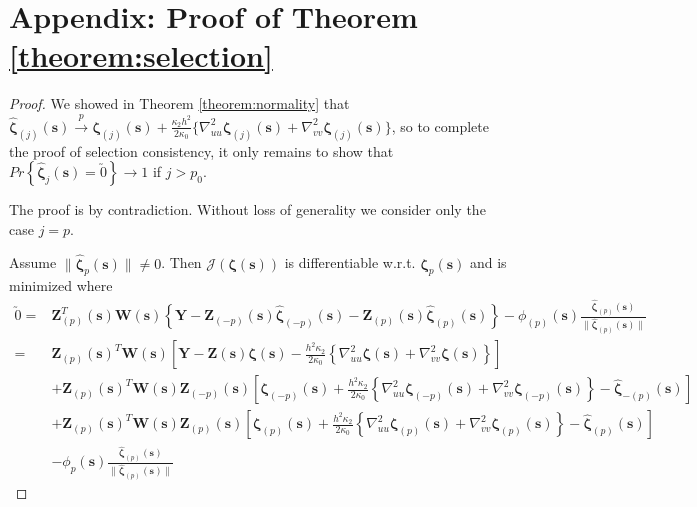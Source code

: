 \documentclass[authoryear,review, 12pt]{elsarticle}
\begin{document}
\section*{Appendix: Proof of Theorem \ref{theorem:selection}\label{sec:gaussian-selection-proof}}
\begin{proof}
We showed in Theorem \ref{theorem:normality} that $\hat{\bm{\zeta}}_{\left(j\right)}\left(\bm{s}\right)\xrightarrow{p}\bm{\zeta}_{\left(j\right)}\left(\bm{s}\right)+\frac{\kappa_{2}h^{2}}{2\kappa_{0}}\{\nabla_{uu}^{2}\bm{\zeta}_{\left(j\right)}\left(\bm{s}\right)+\nabla_{vv}^{2}\bm{\zeta}_{\left(j\right)}\left(\bm{s}\right)\}$,
so to complete the proof of selection consistency, it only remains
to show that $Pr\left\{ \hat{\bm{\zeta}}_{j}\left(\bm{s}\right)=\utilde{0}\right\} \to1$
if $j>p_{0}$.

The proof is by contradiction. Without loss of generality we consider
only the case $j=p$.

Assume $\|\hat{\bm{\zeta}}_{p}(\bm{s})\|\ne0$. Then $\mathcal{J}\left(\bm{\zeta}\left(\bm{s}\right)\right)$
is differentiable w.r.t. $\bm{\zeta}_{p}\left(\bm{s}\right)$ and
is minimized where 
\begin{align*}
\utilde{0}= & \bm{Z}_{\left(p\right)}^{T}\left(\bm{s}\right)\bm{W}\left(\bm{s}\right)\left\{ \bm{Y}-\bm{Z}_{\left(-p\right)}\left(\bm{s}\right)\hat{\bm{\zeta}}_{\left(-p\right)}\left(\bm{s}\right)-\bm{Z}_{\left(p\right)}\left(\bm{s}\right)\hat{\bm{\zeta}}_{\left(p\right)}\left(\bm{s}\right)\right\} -\phi_{\left(p\right)}(\bm{s})\frac{\hat{\bm{\zeta}}_{\left(p\right)}\left(\bm{s}\right)}{\|\hat{\bm{\zeta}}_{\left(p\right)}\left(\bm{s}\right)\|}\\
= & \bm{Z}_{\left(p\right)}\left(\bm{s}\right)^{T}\bm{W}\left(\bm{s}\right)\left[\bm{Y}-\bm{Z}\left(\bm{s}\right)\bm{\zeta}\left(\bm{s}\right)-\frac{h^{2}\kappa_{2}}{2\kappa_{0}}\left\{ \nabla_{uu}^{2}\bm{\zeta}\left(\bm{s}\right)+\nabla_{vv}^{2}\bm{\zeta}\left(\bm{s}\right)\right\} \right]\\
 & +\bm{Z}_{\left(p\right)}\left(\bm{s}\right)^{T}\bm{W}\left(\bm{s}\right)\bm{Z}_{\left(-p\right)}\left(\bm{s}\right)\left[\bm{\zeta}_{\left(-p\right)}\left(\bm{s}\right)+\frac{h^{2}\kappa_{2}}{2\kappa_{0}}\left\{ \nabla_{uu}^{2}\bm{\zeta}_{\left(-p\right)}\left(\bm{s}\right)+\nabla_{vv}^{2}\bm{\zeta}_{\left(-p\right)}\left(\bm{s}\right)\right\} -\hat{\bm{\zeta}}_{-\left(p\right)}\left(\bm{s}\right)\right]\\
 & +\bm{Z}_{\left(p\right)}\left(\bm{s}\right)^{T}\bm{W}\left(\bm{s}\right)\bm{Z}_{\left(p\right)}\left(\bm{s}\right)\left[\bm{\zeta}_{\left(p\right)}\left(\bm{s}\right)+\frac{h^{2}\kappa_{2}}{2\kappa_{0}}\left\{ \nabla_{uu}^{2}\bm{\zeta}_{\left(p\right)}\left(\bm{s}\right)+\nabla_{vv}^{2}\bm{\zeta}_{\left(p\right)}\left(\bm{s}\right)\right\} -\hat{\bm{\zeta}}_{\left(p\right)}\left(\bm{s}\right)\right]\\
 & -\phi_{p}\left(\bm{s}\right)\frac{\hat{\bm{\zeta}}_{\left(p\right)}\left(\bm{s}\right)}{\|\hat{\bm{\zeta}}_{\left(p\right)}\left(\bm{s}\right)\|}
\end{align*}



\end{proof}
\end{document}
